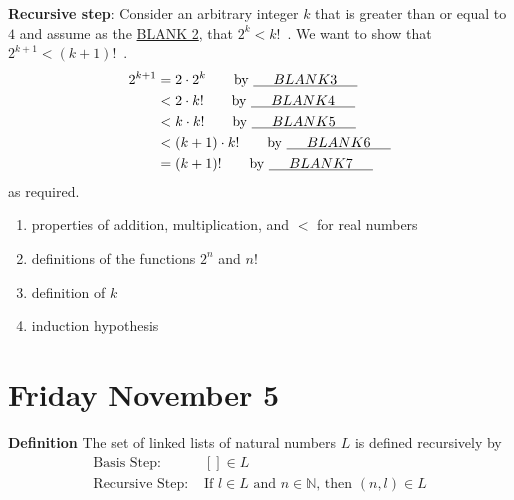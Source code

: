 \documentclass[12pt, oneside]{article}
\begin{document}
\begin{enumerate}
\begin{enumerate}
{\bf Recursive step}: Consider an arbitrary integer $k$ that 
is greater than or equal to $4$
and assume as the \underline{\hspace{0.2in}BLANK 2\hspace{0.2in}}, 
that $2^k < k!$~. We want to show that $2^{k+1} < (k+1)!$~.
\begin{align*}
    2^{k+1} &= 2 \cdot 2^{k} \qquad \text{by }\underline{\hspace{0.2in}BLANK 3\hspace{0.2in}}\\
        &< 2 \cdot k! \qquad \text{by }\underline{\hspace{0.2in}BLANK 4\hspace{0.2in}}\\
        &< k \cdot k! \qquad \text{by }\underline{\hspace{0.2in}BLANK 5\hspace{0.2in}}\\
        &< (k+1) \cdot k!  \qquad \text{by }\underline{\hspace{0.2in}BLANK 6\hspace{0.2in}}\\
        &= (k+1)!  \qquad \text{by }\underline{\hspace{0.2in}BLANK 7\hspace{0.2in}}\\
\end{align*}
as required.

\begin{enumerate}
    \item properties of addition, multiplication, and $<$ for real numbers
    \item definitions of the functions $2^n$ and $n!$
    \item definition of $k$
    \item induction hypothesis
\end{enumerate}
\end{enumerate} \end{enumerate}

\newpage
\section*{Friday November 5}


{\bf Definition} The set of linked lists of natural numbers $L$ is defined recursively by
\[
\begin{array}{ll}
    \textrm{Basis Step: } & [] \in L \\
    \textrm{Recursive Step: } & \textrm{If } l \in L\textrm{ and }n \in \mathbb{N} \textrm{, then } (n, l) \in L
\end{array}
\] 
\end{document}
